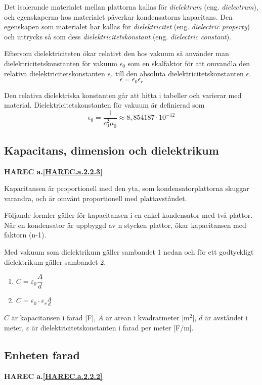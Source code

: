Det isolerande materialet mellan plattorna kallas för \emph{dielektrum}
(eng. \emph{dielectrum}), och egenskaperna hos materialet påverkar kondensatorns
kapacitans.
Den egenskapen som materialet har kallas för \emph{dielektricitet}
(eng. \emph{dielectric property}) och uttrycks så som dess
\emph{dielektricitetskonstant} (eng. \emph{dielectric constant}).

Eftersom dielektriciteten ökar relativt den hos vakuum så använder man
dielektricitetskonstanten för vakuum \(\epsilon_0\) som en skalfaktor för att
omvandla den relativa dielektricitetskonstanten \(\epsilon_r\) till den
absoluta dielektricitetskonstanten \(\epsilon\).
\[
  \epsilon = \epsilon_0\epsilon_r
\]

Den relativa dielektriska konstanten går att hitta i tabeller och varierar
med material. Dielektricitetskonstanten för vakuum är definierad som
\[
  \epsilon_0 = \dfrac{1}{c_0^2\mu_0} \approx 8,854187 \cdot 10^{-12}
\]

\subsection{Kapacitans, dimension och dielektrikum}
\textbf{HAREC a.\ref{HAREC.a.2.2.3}\label{myHAREC.a.2.2.3}}

Kapacitansen är proportionell med den yta, som kondensatorplattorna skuggar
varandra, och är omvänt proportionell med plattavståndet.

Följande formler gäller för kapacitansen i en enkel kondensator med två
plattor. När en kondensator är uppbyggd av n stycken plattor, ökar kapacitansen
med faktorn (n-1).

Med vakuum som dielektrikum gäller sambandet 1 nedan och för ett godtyckligt
dielektrikum gäller sambandet 2.

\begin{enumerate}
  \item \(C = \varepsilon _0 \dfrac{A}{d}\)
  \item \(C = \varepsilon _0 \cdot \varepsilon _r \frac{A}{d}\)
\end{enumerate}

\(C\) är kapacitansen i farad [F], \(A\) är arean i kvadratmeter [m$^2$], $d$ är
avståndet i meter, $\varepsilon$ är dielektricitetskonstanten i farad per meter
[F/m].

\subsection{Enheten farad}
\textbf{HAREC a.\ref{HAREC.a.2.2.2}\label{myHAREC.a.2.2.2}}

